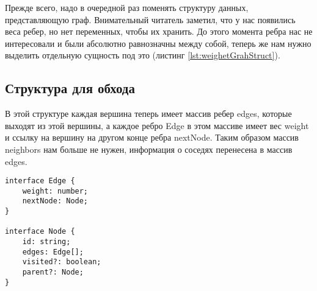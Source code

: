 \documentclass[../article.tex]{subfiles}
\begin{document}
Прежде всего, надо в очередной раз поменять структуру данных, представляющую граф. Внимательный читатель заметил, что у нас появились веса ребер, но нет переменных, чтобы их хранить. До этого момента ребра нас не интересовали и были абсолютно равнозначны между собой, теперь же нам нужно выделить отдельную сущность под это (листинг \ref{lst:weighetGrahStruct}).

\subsection{Структура для обхода}

В этой структуре каждая вершина теперь имеет массив ребер {\firacodebold edges}, которые выходят из этой вершины, а каждое ребро {\firacodebold Edge} в этом массиве имеет вес {\firacodebold weight} и ссылку на вершину на другом конце ребра {\firacodebold nextNode}. Таким образом массив {\firacodebold neighbors} нам больше не нужен, информация о соседях перенесена в массив {\firacodebold edges}.

\begin{ruledelement}
    \begin{lstlisting}[caption={Структура для взвешенного графа}, label={lst:weighetGrahStruct}]
interface Edge {
    weight: number;
    nextNode: Node;
}

interface Node {
    id: string;
    edges: Edge[];
    visited?: boolean;
    parent?: Node;
}
    \end{lstlisting}
\end{ruledelement}
\end{document}
